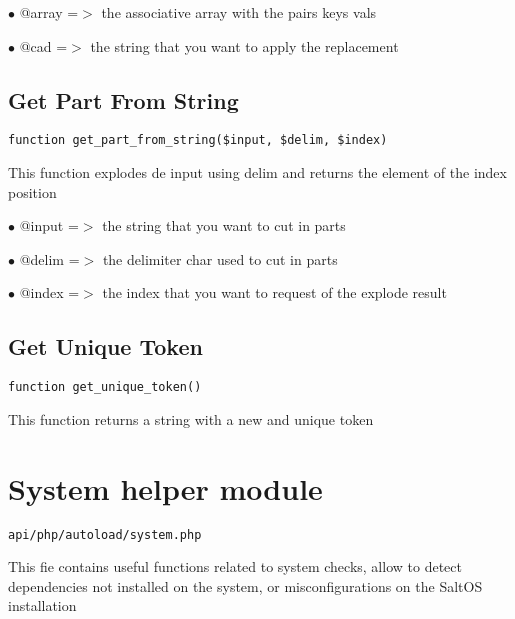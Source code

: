 \documentclass[a4paper]{book}
\begin{document}
\begin{compactitem}
\item[\color{myblue}$\bullet$] @array =$>$ the associative array with the pairs keys vals
\item[\color{myblue}$\bullet$] @cad   =$>$ the string that you want to apply the replacement
\end{compactitem}

\hypertarget{toc277}{}
\subsection{Get Part From String}

\begin{lstlisting}
function get_part_from_string($input, $delim, $index)
\end{lstlisting}

This function explodes de input using delim and returns the element
of the index position

\begin{compactitem}
\item[\color{myblue}$\bullet$] @input =$>$ the string that you want to cut in parts
\item[\color{myblue}$\bullet$] @delim =$>$ the delimiter char used to cut in parts
\item[\color{myblue}$\bullet$] @index =$>$ the index that you want to request of the explode result
\end{compactitem}

\hypertarget{toc278}{}
\subsection{Get Unique Token}

\begin{lstlisting}
function get_unique_token()
\end{lstlisting}

This function returns a string with a new and unique token

\hypertarget{toc279}{}
\section{System helper module}

\begin{lstlisting}
api/php/autoload/system.php
\end{lstlisting}

This fie contains useful functions related to system checks, allow to detect dependencies not
installed on the system, or misconfigurations on the SaltOS installation
\end{document}
